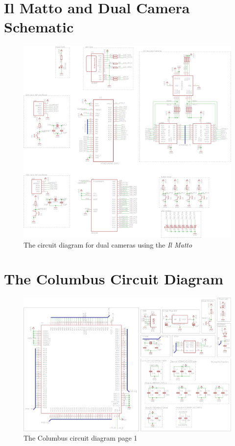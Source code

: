 \section{Il Matto and Dual Camera Schematic}\label{sch:IlMatto:Cameras}
\begin{figure}[ht!]
\centering
\includegraphics[angle = 90, width=\textwidth,height=\textheight,keepaspectratio]{Figures/IlMattoCamera_CircuitDiagram.png} 
\caption{The circuit diagram for dual cameras using the \textit{Il Matto}}
\label{sch:DualCam_Schematic}
\end{figure}
\clearpage

\section{The Columbus Circuit Diagram} \label{sch:Columbus:CircuitDiagram}
\begin{figure}[ht!]
\centering
\includegraphics[angle = 90, width=\textwidth,height=\textheight,keepaspectratio]{./Figures/ColumbusCircuitPage1.png}
\caption{The Columbus circuit diagram page 1}
\label{sch:Columbus_Schematic:1}
\end{figure}

